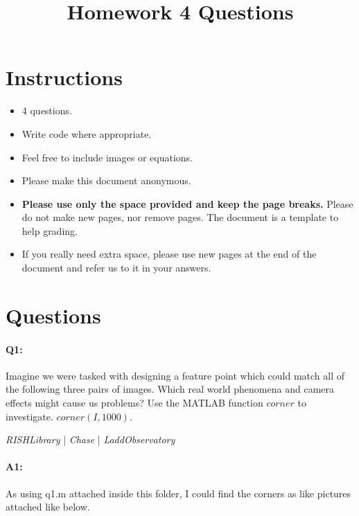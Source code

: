 \title{\vspace{-1cm}Homework 4 Questions}



\maketitle
\vspace{-3cm}
\thispagestyle{fancy}

\section*{Instructions}
\begin{itemize}
  \item 4 questions.
  \item Write code where appropriate.
  \item Feel free to include images or equations.
  \item Please make this document anonymous.
  \item \textbf{Please use only the space provided and keep the page breaks.} Please do not make new pages, nor remove pages. The document is a template to help grading.
  \item If you really need extra space, please use new pages at the end of the document and refer us to it in your answers.
\end{itemize}

\section*{Questions}

\paragraph{Q1:} Imagine we were tasked with designing a feature point which could match all of the following three pairs of images. Which real world phenomena and camera effects might cause us problems?
Use the MATLAB function \href{https://www.mathworks.com/help/images/ref/corner.html}{$corner$} to investigate. $corner(I,1000)$.

\emph{RISHLibrary} | \emph{Chase} | \emph{LaddObservatory}

\paragraph{A1:} As using q1.m attached inside this folder, I could find the corners as like pictures attached like below.

